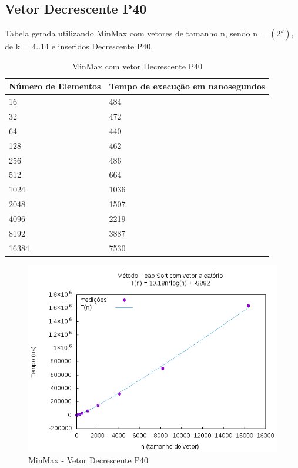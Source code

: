 \documentclass[12pt,a4paper,twoside]{report}
\begin{document}
\subsection{Vetor Decrescente P40}
Tabela gerada utilizando MinMax com vetores de tamanho n, sendo n = $(2^k)$, de k = 4..14 e inseridos Decrescente P40.
\begin{table}[H]
\centering
\caption{MinMax com vetor Decrescente P40}
\label{my-label}
\begin{tabular}{|l|l|}
\hline
\multicolumn{1}{|c|}{\textbf{Número de Elementos}} & \multicolumn{1}{c|}{\textbf{Tempo de execução em nanosegundos}} \\ \hline
16 & 484 \\ \hline
32 & 472 \\ \hline
64 & 440 \\ \hline
128 & 462 \\ \hline
256 & 486 \\ \hline
512 & 664 \\ \hline
1024 & 1036 \\ \hline
2048 & 1507 \\ \hline
4096 & 2219 \\ \hline
8192 & 3887 \\ \hline
16384 & 7530 \\ \hline
\end{tabular}
\end{table}

\begin{figure}[H]
    \centering
    \includegraphics[width=0.7\linewidth]{graficos/HeapSort/vIntAleatorio/vIntAleatorio.png}
  \caption{MinMax - Vetor Decrescente P40}
\end{figure}
\end{document}
